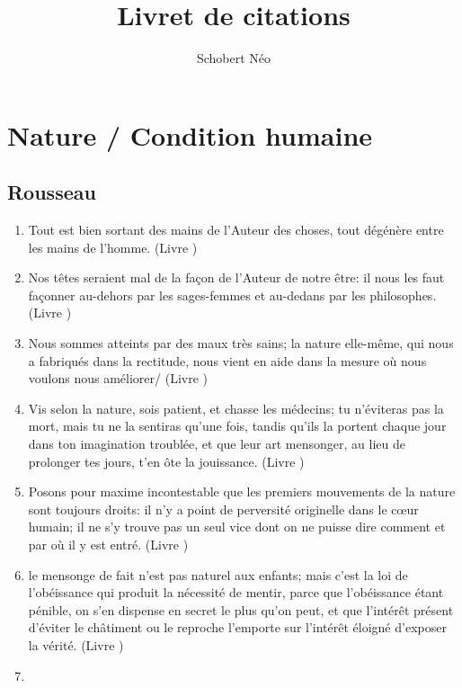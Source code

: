 \documentclass[a4paper, 11pt, hidelinks]{article}
\newcommand{\rb}[1]{\Romanbar{#1}}
\begin{document}
\newcommand{\grad}[1]{\vv{grad}#1}


\title{Livret de citations}
\author{Schobert Néo}

\maketitle

\tableofcontents


\newpage














\section{Nature / Condition humaine}



\subsection{Rousseau}


\begin{enumerate}
    \item Tout est bien sortant des mains de l'Auteur des choses, tout dégénère entre les mains de l'homme. (Livre \rb{1})
    \item Nos têtes seraient mal de la façon de l'Auteur de notre être: il nous les faut façonner au-dehors par les sages-femmes et au-dedans par les philosophes. (Livre \rb{1})
    \item Nous sommes atteints par des maux très sains; la nature elle-même, qui nous a fabriqués dans la rectitude, nous vient en aide dans la mesure où nous voulons nous améliorer/ (Livre \rb{2})
    \item Vis selon la nature, sois patient, et chasse les médecins; tu n'éviteras pas la mort, mais tu ne la sentiras qu'une fois, tandis qu'ils la portent chaque jour dans ton imagination troublée, et que leur art mensonger, au lieu de prolonger tes jours, t'en ôte la jouissance. (Livre \rb{2})
    \item Posons pour maxime incontestable que les premiers mouvements de la nature sont toujours droits: il n'y a point de perversité originelle dans le c\oe ur humain; il ne s'y trouve pas un seul vice dont on ne puisse dire comment et par où il y est entré. (Livre \rb{2})
    \item le mensonge de fait n'est pas naturel aux enfants; mais c'est la loi de l'obéissance qui produit la nécessité de mentir, parce que l'obéissance étant pénible, on s'en dispense en secret le plus qu'on peut, et que l'intérêt présent d'éviter le châtiment ou le reproche l'emporte sur l'intérêt éloigné d'exposer la vérité. (Livre \rb{2}) 
    \item
\end{enumerate}
\end{document}
